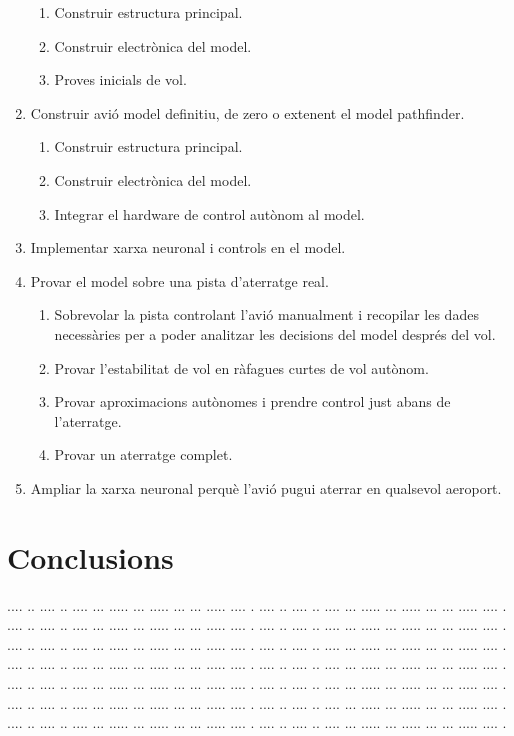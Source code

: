 \documentclass[10pt,a4paper,twocolumn,twoside]{article}
\begin{document}
\begin{enumerate}
\begin{enumerate}[label*=\arabic*.]
        \item Construir estructura principal.
        \item Construir electrònica del model.
        \item Proves inicials de vol.
    \end{enumerate}
    \item Construir avió model definitiu, de zero o extenent el model pathfinder.
    \begin{enumerate}[label*=\arabic*.]
        \item Construir estructura principal.
        \item Construir electrònica del model.
        \item Integrar el hardware de control autònom al model.
    \end{enumerate}
    \item Implementar xarxa neuronal i controls en el model.
    \item Provar el model sobre una pista d'aterratge real.
    \begin{enumerate}[label*=\arabic*.]
        \item Sobrevolar la pista controlant l'avió manualment i recopilar les dades necessàries per a poder analitzar les decisions del model després del vol.
        \item Provar l'estabilitat de vol en ràfagues curtes de vol autònom.
        \item Provar aproximacions autònomes i prendre control just abans de l'aterratge.
        \item Provar un aterratge complet.
    \end{enumerate}
    \item Ampliar la xarxa neuronal perquè l'avió pugui aterrar en qualsevol aeroport.
\end{enumerate}


\section{Conclusions}

.... ..  .... .. .... ... ..... ... ..... ... ... ..... .... .
.... ..  .... .. .... ... ..... ... ..... ... ... ..... .... .
.... ..  .... .. .... ... ..... ... ..... ... ... ..... .... .
.... ..  .... .. .... ... ..... ... ..... ... ... ..... .... .
.... ..  .... .. .... ... ..... ... ..... ... ... ..... .... .
.... ..  .... .. .... ... ..... ... ..... ... ... ..... .... .
.... ..  .... .. .... ... ..... ... ..... ... ... ..... .... .
.... ..  .... .. .... ... ..... ... ..... ... ... ..... .... .
.... ..  .... .. .... ... ..... ... ..... ... ... ..... .... .
.... ..  .... .. .... ... ..... ... ..... ... ... ..... .... .
.... ..  .... .. .... ... ..... ... ..... ... ... ..... .... .
.... ..  .... .. .... ... ..... ... ..... ... ... ..... .... .
.... ..  .... .. .... ... ..... ... ..... ... ... ..... .... .
.... ..  .... .. .... ... ..... ... ..... ... ... ..... .... .
\end{document}
